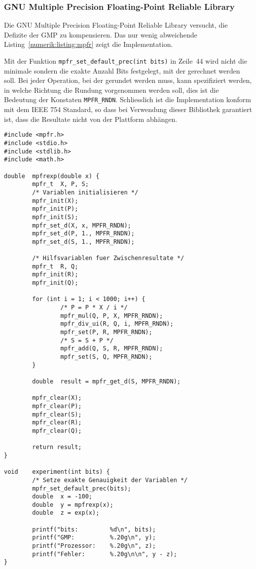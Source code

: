 \subsubsection{GNU Multiple Precision Floating-Point Reliable Library}
Die GNU Multiple Precision Floating-Point Reliable Library versucht,
die Defizite der GMP zu kompensieren.
Das nur wenig abweichende Listing~\ref{numerik:listing:mpfr} zeigt
die Implementation.

Mit der Funktion \verb+mpfr_set_default_prec(int bits)+ in Zeile~44
wird nicht die minimale sondern die exakte Anzahl Bits festgelegt,
mit der gerechnet werden soll.
Bei jeder Operation, bei der gerundet werden muss, kann spezifiziert
werden, in welche Richtung die Rundung vorgenommen werden soll, dies
ist die Bedeutung der Konstaten \verb+MPFR_RNDN+.
Schliesslich ist die Implementation konform mit dem IEEE 754 Standard,
so dass bei Verwendung dieser Bibliothek garantiert ist, dass die
Resultate nicht von der Plattform abhängen.

\begin{lstlisting}[float,style=C,caption={C-Programm zur Berechnung von $e^x$ mit Hilfe der Taylor-Reihe, implementiert mit MPFR},label={numerik:listing:mpfr}]
#include <mpfr.h>
#include <stdio.h>
#include <stdlib.h>
#include <math.h>

double  mpfrexp(double x) {
        mpfr_t  X, P, S;
        /* Variablen initialisieren */
        mpfr_init(X);
        mpfr_init(P);
        mpfr_init(S);
        mpfr_set_d(X, x, MPFR_RNDN);
        mpfr_set_d(P, 1., MPFR_RNDN);
        mpfr_set_d(S, 1., MPFR_RNDN);

        /* Hilfsvariablen fuer Zwischenresultate */
        mpfr_t  R, Q;
        mpfr_init(R);
        mpfr_init(Q);

        for (int i = 1; i < 1000; i++) {
                /* P = P * X / i */
                mpfr_mul(Q, P, X, MPFR_RNDN);
                mpfr_div_ui(R, Q, i, MPFR_RNDN);
                mpfr_set(P, R, MPFR_RNDN);
                /* S = S + P */
                mpfr_add(Q, S, R, MPFR_RNDN);
                mpfr_set(S, Q, MPFR_RNDN);
        }

        double  result = mpfr_get_d(S, MPFR_RNDN);

        mpfr_clear(X);
        mpfr_clear(P);
        mpfr_clear(S);
        mpfr_clear(R);
        mpfr_clear(Q);

        return result;
}

void    experiment(int bits) {
        /* Setze exakte Genauigkeit der Variablen */
        mpfr_set_default_prec(bits);
        double  x = -100;
        double  y = mpfrexp(x);
        double  z = exp(x);

        printf("bits:         %d\n", bits);
        printf("GMP:          %.20g\n", y);
        printf("Prozessor:    %.20g\n", z);
        printf("Fehler:       %.20g\n\n", y - z);
}
\end{lstlisting}


